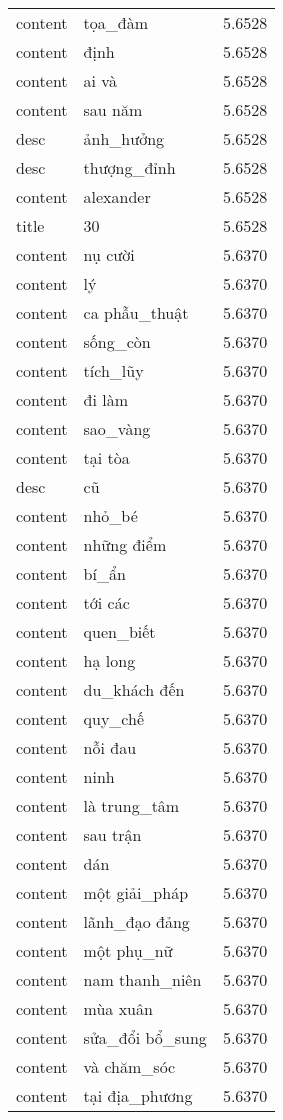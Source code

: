 \documentclass{article}
\begin{document}
\begin{tabular}{lll}
content & tọa\_đàm & 5.6528\\
content & định & 5.6528\\
content & ai và & 5.6528\\
content & sau năm & 5.6528\\
desc & ảnh\_hưởng & 5.6528\\
desc & thượng\_đỉnh & 5.6528\\
content & alexander & 5.6528\\
title & 30 & 5.6528\\
content & nụ cười & 5.6370\\
content & lý & 5.6370\\
content & ca phẫu\_thuật & 5.6370\\
content & sống\_còn & 5.6370\\
content & tích\_lũy & 5.6370\\
content & đi làm & 5.6370\\
content & sao\_vàng & 5.6370\\
content & tại tòa & 5.6370\\
desc & cũ & 5.6370\\
content & nhỏ\_bé & 5.6370\\
content & những điểm & 5.6370\\
content & bí\_ẩn & 5.6370\\
content & tới các & 5.6370\\
content & quen\_biết & 5.6370\\
content & hạ long & 5.6370\\
content & du\_khách đến & 5.6370\\
content & quy\_chế & 5.6370\\
content & nỗi đau & 5.6370\\
content & ninh & 5.6370\\
content & là trung\_tâm & 5.6370\\
content & sau trận & 5.6370\\
content & dán & 5.6370\\
content & một giải\_pháp & 5.6370\\
content & lãnh\_đạo đảng & 5.6370\\
content & một phụ\_nữ & 5.6370\\
content & nam thanh\_niên & 5.6370\\
content & mùa xuân & 5.6370\\
content & sửa\_đổi bổ\_sung & 5.6370\\
content & và chăm\_sóc & 5.6370\\
content & tại địa\_phương & 5.6370\\

\end{tabular}
\end{document}
